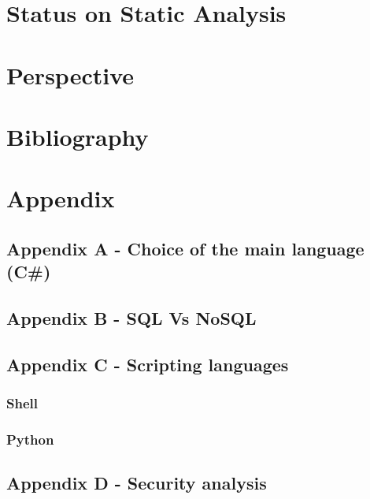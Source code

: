 \documentclass{article}
\begin{document}
\section{Status on Static Analysis}



\section{Perspective}


\section{Bibliography}
\printbibliography[title={Bibliography}]


\section{Appendix}
\subsection{Appendix A - Choice of the main language (C\#)} \label{languagechoice}


\subsection{Appendix B - SQL Vs NoSQL} \label{sqlvsnosql}


\subsection{Appendix C - Scripting languages} \label{scriptinglanguages}


\subsubsection{Shell}


\subsubsection{Python}


\subsection{Appendix D - Security analysis} \label{securityanalysis}

\end{document}
